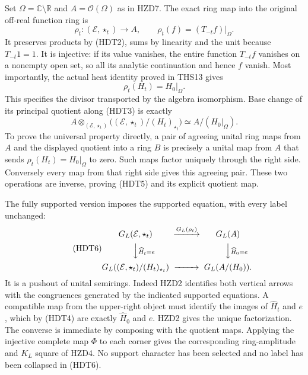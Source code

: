Set $\Omega=\mathbb C\setminus\mathbb R$ and
$A=\mathcal O(\Omega)$ as in HZD7. The exact ring map into the
original off-real function ring is
\begin{equation}\tag{HDT3}
 \rho_t:(\mathcal E,\star_t)\longrightarrow A,
       \qquad \rho_t(f)=(T_{-t}f)|_\Omega.
\end{equation}
It preserves products by (HDT2), sums by linearity and the unit
because $T_{-t}1=1$. It is injective: if its value vanishes, the
entire function $T_{-t}f$ vanishes on a nonempty open set, so all
its analytic continuation and hence $f$ vanish. Most importantly,
the actual heat identity proved in THS13 gives
\begin{equation}\tag{HDT4}
 \rho_t(H_t)=H_0|_\Omega.
\end{equation}
This specifies the divisor transported by the algebra isomorphism.
Base change of its principal quotient along (HDT3) is exactly
\begin{equation}\tag{HDT5}
 A\otimes_{(\mathcal E,\star_t)}
       \bigl((\mathcal E,\star_t)/(H_t)_{\star_t}\bigr)
          \simeq A/(H_0|_\Omega).
\end{equation}
To prove the universal property directly, a pair of agreeing
unital ring maps from $A$ and the displayed quotient into a
ring $B$ is precisely a unital map from $A$ that sends
$\rho_t(H_t)=H_0|_\Omega$ to zero. Such maps factor uniquely
through the right side. Conversely every map from that right
side gives this agreeing pair. These two operations are inverse,
proving (HDT5) and its explicit quotient map.

The fully supported version imposes the supported equation, with
every label unchanged:
\begin{equation}\tag{HDT6}
\begin{CD}
 G_L(\mathcal E,\star_t) @>{G_L(\rho_t)}>> G_L(A)\\
 @VV{\widehat H_t=e}V @VV{\widehat H_0=e}V\\
 G_L((\mathcal E,\star_t)/(H_t)_{\star_t})
       @>>> G_L(A/(H_0)).
\end{CD}
\end{equation}
It is a pushout of unital semirings. Indeed HZD2 identifies
both vertical arrows with the congruences generated by the
indicated supported equations. A compatible map from the
upper-right object must identify the images of $\widehat H_t$
and $e$, which by (HDT4) are exactly $\widehat H_0$ and $e$.
HZD2 gives the unique factorization. The converse is immediate
by composing with the quotient maps. Applying the injective
complete map $\Phi$ to each corner gives the corresponding
ring-amplitude and $K_L$ square of HZD4. No support character
has been selected and no label has been collapsed in (HDT6).

